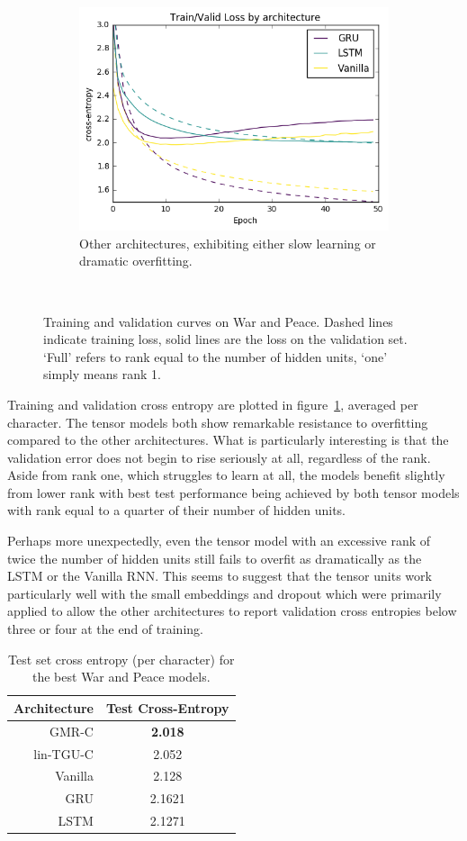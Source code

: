 \begin{figure}
\begin{subfigure}[t]{0.3\textwidth}
	\centering
	\includegraphics[width=\textwidth]{exps/wp/others}
	\caption{Other architectures, exhibiting either slow learning or dramatic overfitting.}
\end{subfigure}~
\caption{Training and validation curves on War and Peace. 
		 Dashed lines indicate training loss, solid lines are the loss on the validation set.
		 `Full' refers to rank equal to the number of hidden units, `one' simply means rank 1.}
\label{fig:wp}
\end{figure}

Training and validation cross entropy are plotted in figure~\ref{fig:wp}, averaged per character. 
The tensor models both
show remarkable resistance to overfitting compared to the other architectures. What is particularly
interesting is that the validation error does not begin to rise seriously at all, regardless of the
rank. Aside from rank one, which struggles to learn at all, the models benefit slightly from lower
rank with best test performance being achieved by both tensor models with rank equal to a quarter
of their number of hidden units.

Perhaps more unexpectedly, even the tensor model with an excessive rank of twice the number of hidden
units still fails to overfit as dramatically as the LSTM or the Vanilla RNN. This seems to suggest that
the tensor units work particularly well with the small embeddings and dropout which were primarily
applied to allow the other architectures to report validation cross entropies below three or four
at the end of training.

\begin{table}
\begin{tabu} to \textwidth {r||c}
Architecture & Test Cross-Entropy \\
\hline
GMR-C & \textbf{2.018} \\ %
lin-TGU-C & 2.052 \\ %
\hline
Vanilla & 2.128 \\ %
GRU & 2.1621 \\ %
LSTM & 2.1271 \\%
\hline
\end{tabu}
\caption{Test set cross entropy (per character) for the best War and Peace models.}
\label{tab:wptest}
\end{table}

